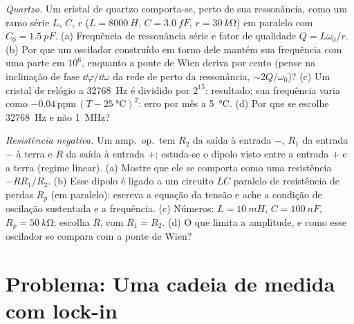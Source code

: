 \begin{exercise}[$\star\star\star$]\label{exo:b2:feedback-oscillators:11}
\emph{Quartzo.} Um cristal de quartzo comporta-se, perto de sua ressonância, como um
ramo série $L$, $C$, $r$ ($L = \qty{8000}{H}$, $C = \qty{3.0}{fF}$, $r =
\qty{30}{k\ohm}$) em paralelo com $C_0 = \qty{1.5}{pF}$. (a) Frequência de ressonância
série e fator de qualidade $Q = L\omega_0/r$. (b) Por que um oscilador
construído em torno dele mantém sua frequência com uma parte em $10^6$, enquanto a ponte
de Wien deriva por cento (pense na inclinação de fase $\dd\varphi/\dd\omega$ da
rede de  perto da ressonância, $\sim 2Q/\omega_0$)? (c) Um cristal de relógio
a \qty{32768}{Hz} é dividido por $2^{15}$: resultado; sua frequência
varia como $-0.04\,\text{ppm}\,(T - \qty{25}{\degreeCelsius})^2$: erro por
mês a \qty{5}{\degreeCelsius}. (d) Por que se escolhe \qty{32768}{Hz} e não
\qty{1}{MHz}?
\end{exercise}

\begin{exercise}[$\star\star\star$]\label{exo:b2:feedback-oscillators:12}
\emph{Resistência negativa.} Um amp.\ op.\ tem $R_2$ da saída à entrada
$-$, $R_1$ da entrada $-$ à terra e $R$ da saída à entrada $+$;
estuda-se o dipolo visto entre a entrada $+$ e a terra (regime
linear). (a) Mostre que ele se comporta como uma resistência $-RR_1/R_2$. (b) Esse
dipolo é ligado a um circuito $LC$ paralelo de resistência de perdas
$R_p$ (em paralelo): escreva a equação da tensão e ache a
condição de oscilação sustentada e a frequência. (c) Números: $L
= \qty{10}{mH}$, $C = \qty{100}{nF}$, $R_p = \qty{50}{k\ohm}$; escolha $R$, com $R_1 =
R_2$. (d) O que limita a amplitude, e como esse oscilador se
compara com a ponte de Wien?
\end{exercise}

\section{Problema: Uma cadeia de medida com lock-in}

